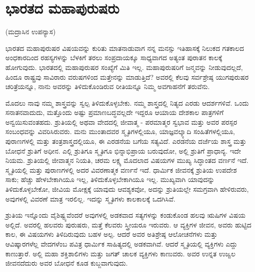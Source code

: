 
\chapter{ಭಾರತದ ಮಹಾಪುರುಷರು}

\begin{center}
(ಮದ್ರಾಸಿನ ಉಪನ್ಯಾಸ)
\end{center}

ಭಾರತದ ಮಹಾಪುರುಷರ ವಿಷಯವನ್ನು ಕುರಿತು ಮಾತನಾಡುವಾಗ ನನ್ನ ಮನಸ್ಸು ಇತಿಹಾಸಕ್ಕೆ ನಿಲುಕದ ಗತಕಾಲದ ಅಂಧಕಾರದಿಂದ ರಹಸ್ಯಗಳನ್ನು ಬೆಳಕಿಗೆ ತರಲು ಸಂಪ್ರದಾಯಕ್ಕೂ ಸಾಧ್ಯವಾಗದ ಅತ್ಯಂತ ಪುರಾತನ ಕಾಲಕ್ಕೆ ಹೋಗುವುದು. ಭಾರತದಲ್ಲಿ ಮಹಾಪುರುಷರ ಸಂಖ್ಯೆಗೆ ಮಿತಿ ಇಲ್ಲ. ಮಹಾಪುರುಷರಿಗೆ ಜನ್ಮವನ್ನು ನೀಡುವುದಲ್ಲದೆ, ಹಿಂದೂ ರಾಷ್ಟ್ರವು ಸಾವಿರಾರು ವರುಷಗಳಿಂದ ಮತ್ತೇನನ್ನು ಮಾಡುತ್ತಿದೆ? ಅವರಲ್ಲಿ ಕೆಲವು ಸರ್ವಶ್ರೇಷ್ಠ ಯುಗಪುರುಷರ ಚರಿತ್ರೆಯನ್ನೂ, ನಾನು ಅವರನ್ನು ತಿಳಿದುಕೊಂಡಿರುವ ರೀತಿಯನ್ನೂ ನಿಮ್ಮ ಅವಗಾಹನೆಗೆ ತರುವೆನು.

ಮೊದಲು ನಾವು ನಮ್ಮ ಶಾಸ್ತ್ರವನ್ನು ಸ್ವಲ್ಪ ತಿಳಿದುಕೊಳ್ಳಬೇಕು. ನಮ್ಮ ಶಾಸ್ತ್ರದಲ್ಲಿ ನಿತ್ಯದ ಎರಡು ಆದರ್ಶಗಳಿವೆ. ಒಂದು ಸನಾತನವಾದುದು, ಮತ್ತೊಂದು ಅಷ್ಟು ಪ್ರಮಾಣಬದ್ಧವಲ್ಲದೇ ಇದ್ದರೂ ಆಯಾಯ ದೇಶಕಾಲ ಪಾತ್ರಗಳಿಗೆ ಅನ್ವಯಿಸುವಂತಹದು. ಶ್ರುತಿಯಲ್ಲಿ ಅಥವಾ ವೇದದಲ್ಲಿ ಜೀವಾತ್ಮ - ಪರಮಾತ್ಮರ ಸ್ವಭಾವ ಮತ್ತು ಅವರ ಪರಸ್ಪರ ಸಂಬಂಧವನ್ನು ವಿವರಿಸಿರುವರು. ಮನು ಮುಂತಾದವರ ಸ್ಮೃತಿಗಳಲ್ಲಿಯೂ, ಯಾಜ್ಞವಲ್ಕ್ಯಾದಿ ಸಂಹಿತೆಗಳಲ್ಲಿಯೂ, ಪುರಾಣಗಳಲ್ಲಿ ಮತ್ತು ತಂತ್ರಶಾಸ್ತ್ರದಲ್ಲಿಯೂ, ಈ ಎರಡನೆಯ ಬಗೆಯ ಸತ್ಯವಿದೆ. ಎರಡನೆಯ ದರ್ಜೆಯ ಶಾಸ್ತ್ರ ಮತ್ತು ಬೋಧನೆ ಶ್ರುತಿಗೆ ಅಧೀನ. ಎಲ್ಲಿ ಶ್ರುತಿಗೂ ಸ್ಮೃತಿಗೂ ಭಿನ್ನಾಭಿಪ್ರಾಯ ಬರುವುದೋ, ಅಲ್ಲಿ ಶ್ರುತಿಗೆ ಪ್ರಾಧಾನ್ಯ. ಇದೇ ನಿಯಮ. ಶ್ರುತಿಯಲ್ಲಿ ಜೀವಾತ್ಮನ ನಿಯತಿ, ಚರಮ ಲಕ್ಷ್ಯ ಮೊದಲಾದ ವಿಷಯಗಳ ಮುಖ್ಯ ಸಿದ್ಧಾಂತದ ವರ್ಣನೆ ಇದೆ. ಸ್ಮೃತಿಯಲ್ಲಿ ಮತ್ತು ಪುರಾಣಗಳಲ್ಲಿ ಅದರ ವಿವರಣಾತ್ಮಕ ವರ್ಣನೆ ಇದೆ. ಧಾರ್ಮಿಕ ಜೀವನಕ್ಕೆ ಶ್ರುತಿಯ ಉಪದೇಶ ಸಾಕು; ಹೆಚ್ಚು ಹೇಳಬೇಕಾಗಿಯೂ ಇಲ್ಲ, ತಿಳಿದುಕೊಳ್ಳಬೇಕಾಗಿಯೂ ಇಲ್ಲ. ಮುಖ್ಯವಾಗಿ ಯಾವುದನ್ನು ತಿಳಿದುಕೊಳ್ಳಬೇಕೋ, ಜೀವಿಯ ಮೋಕ್ಷಕ್ಕೆ ಯಾವುದು ಆವಶ್ಯಕವೋ, ಅದನ್ನು ಶ್ರುತಿಯಲ್ಲೇ ಸಮಗ್ರವಾಗಿ ಹೇಳಿರುವರು, ಅವುಗಳಲ್ಲಿ ವಿವರಣೆ ಮಾತ್ರ ಇರಲಿಲ್ಲ. ಇದನ್ನು ಸ್ಮೃತಿಗಳು ಕಾಲಕಾಲಕ್ಕೆ ಒದಗಿಸಿವೆ.

ಶ್ರುತಿಯ ಇನ್ನೊಂದು ವೈಶಿಷ್ಟ್ಯವೆಂದರೆ ಅವುಗಳಲ್ಲಿ ಅಡಕವಾದ ಸತ್ಯಗಳನ್ನು ಕಂಡುಕೊಂಡ ಹಲವು ಋಷಿಗಳ ವಿಷಯ ಅಲ್ಲಿದೆ. ಅವರಲ್ಲಿ ಹಲವರು ಪುರುಷರು, ಮತ್ತೆ ಕೆಲವರು ಸ್ತ್ರೀಯರೂ ಇರುವರು. ಆ ವ್ಯಕ್ತಿಗಳ ಜೀವನ, ಅವರು ಹುಟ್ಟಿದ ಕಾಲ, ಈ ವಿಷಯಗಳು ತಿಳಿದಿರುವುದು ಬಹಳ ಅಲ್ಪ. ಆದರೆ ಅವರ ಅತಿಶ್ರೇಷ್ಠ ಆಲೋಚನೆಗಳು ಮತ್ತು ಆವಿಷ್ಕಾರಗಳೆಲ್ಲ ವೇದಗಳೆಂಬ ಪವಿತ್ರ ಧಾರ್ಮಿಕ ಸಾಹಿತ್ಯದಲ್ಲಿ ಅಡಕವಾಗಿವೆ. ಆದರೆ ಸ್ಮೃತಿಯಲ್ಲಿ ವ್ಯಕ್ತಿಗಳು ಎದ್ದು ಕಾಣುತ್ತಾರೆ. ಅಲ್ಲಿ ಮಹಾ ಶಕ್ತಿಶಾಲಿಗಳು ಮತ್ತು ಜಗತ್​ ಚಾಲಕ ವ್ಯಕ್ತಿಗಳು ಕಾಣುವರು. ಅವರ ಉನ್ನತ ಉಜ್ವಲ ಜೀವನದೆದುರು ಅವರ ಬೋಧನೆ ಕೂಡ ಕುಬ್ಜವಾಗುವುದು.

